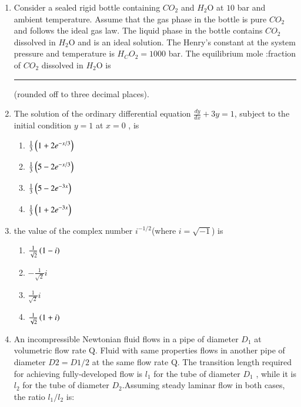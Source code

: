 \documentclass[journal,12pt,onecolumn]{IEEEtran}
\theoremstyle{remark}
\begin{document}
\begin{enumerate}
 \hfill{}
    \item Consider a sealed rigid bottle containing $CO_2$ and $H_2$O at $10$ bar and ambient temperature. Assume that the gas phase in the bottle is pure $CO_2$ and follows the ideal gas law. The liquid phase in the bottle contains $CO_2$ dissolved in $H_2$O and is an ideal solution. The Henry's constant at the system pressure and temperature is $H_CO_2 = 1000$ bar. The equilibrium mole :fraction of $CO_2$ dissolved in $H_2$O is \rule{1cm}{0.1mm} (rounded off to three decimal places).   
    
 \hfill{}
    \item 
        The solution of the ordinary differential equation $\frac{dy}{dx} + 3y = 1$, subject to the initial condition $y = 1$ at $x = 0$ , is 
        
      \hfill{}
    
\begin{multicols}{2}
    \begin{enumerate}
        \item $\frac{1}{3}\left(1 + 2e^{-x/3}\right)$
        \item $\frac{1}{3}\left(5 - 2e^{-x/3}\right)$
        \item $\frac{1}{3}\left(5 - 2e^{-3x}\right)$
        \item $\frac{1}{3}\left(1 + 2e^{-3x}\right)$
    \end{enumerate}
\end{multicols}

    \item 
        the value of the complex number ${i}^{-1/2}$(where ${i} = \sqrt{-1}$) is
        
     \hfill{}

\begin{multicols}{4}
    \begin{enumerate}
    
    \item $\frac{1}{\sqrt{2}}\left(1 -i\right)$
    \item $-\frac{1}{\sqrt{2}}i$
    \item $\frac{1}{\sqrt{2}}i$
    \item $\frac{1}{\sqrt{2}}\left(1+i\right)$
    \end{enumerate}
\end{multicols}

    \item An incompressible Newtonian fluid flows in a pipe of diameter $D_1$ at volumetric flow rate Q. Fluid with same properties flows in another pipe of diameter $D2 = D1 / 2$ at the same flow rate Q. The transition length required for achieving fully-developed flow is $l_1$ for the tube of diameter $D_1$ , while it is $l_2$ for the tube of diameter $D_2$.Assuming steady laminar flow in both cases, the ratio $l_1/l_2$ is: 
    

\end{enumerate}
\end{document}
